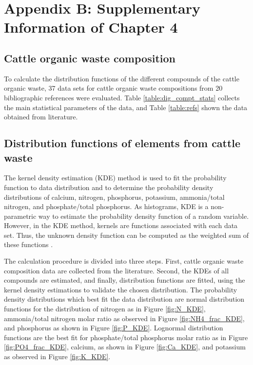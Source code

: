\chapter{Appendix B: Supplementary Information of Chapter 4}

\begin{refsection}[referencesCh3]
\section{Cattle organic waste composition} \label{ApBcomp_dist}
To calculate the distribution functions of the different compounds of the cattle organic waste, 37 data sets for cattle organic waste compositions from 20 bibliographic references were evaluated. Table \ref{table:dig_compt_stats} collects the main statistical parameters of the data, and Table \ref{table:refs} shown the data obtained from literature.

\section{Distribution functions of elements from cattle waste}

The kernel density estimation (KDE) method is used to fit the probability function to data distribution and to determine the probability density distributions of calcium, nitrogen, phosphorus, potassium, ammonia/total nitrogen, and phosphate/total phosphorus. As histograms, KDE is a non-parametric way to estimate the probability density function of a random variable. However, in the KDE method, kernels are functions associated with each data set. Thus, the unknown density function can be computed as the weighted sum of these functions \citep{Duong}. 

The calculation procedure is divided into three steps. First, cattle organic waste composition data are collected from the literature. Second, the KDEs of all compounds are estimated, and finally, distribution functions are fitted, using the kernel density estimations to validate the chosen distribution. The probability density distributions which best fit the data distribution are normal distribution functions for the distribution of nitrogen as in Figure \ref{fig:N_KDE}, ammonia/total nitrogen molar ratio as observed in Figure \ref{fig:NH4_frac_KDE}, and phosphorus as shown in Figure \ref{fig:P_KDE}. Lognormal distribution functions are the best fit for phosphate/total phosphorus molar ratio as in Figure \ref{fig:PO4_frac_KDE}, calcium, as shown in Figure \ref{fig:Ca_KDE}, and potassium as observed in Figure \ref{fig:K_KDE}.


\end{refsection}
